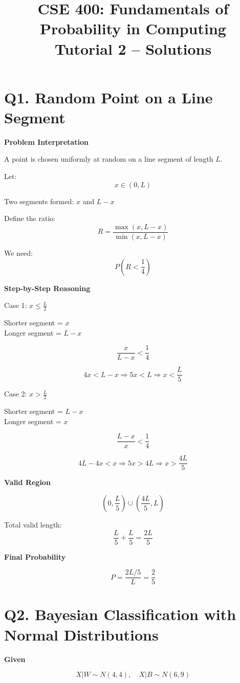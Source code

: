 \documentclass[11pt]{article}
\title{CSE 400: Fundamentals of Probability in Computing\\
Tutorial 2 -- Solutions}
\date{}
\begin{document}
\maketitle

\section*{Q1. Random Point on a Line Segment}

\textbf{Problem Interpretation}

A point is chosen uniformly at random on a line segment of length $L$.

Let:
\[
x \in (0, L)
\]

Two segments formed: $x$ and $L - x$

Define the ratio:
\[
R = \frac{\max(x, L - x)}{\min(x, L - x)}
\]

We need:
\[
P\left(R < \frac{1}{4}\right)
\]

\textbf{Step-by-Step Reasoning}

Case 1: $x \le \frac{L}{2}$

Shorter segment = $x$ \\
Longer segment = $L - x$

\[
\frac{x}{L - x} < \frac{1}{4}
\]

\[
4x < L - x
\Rightarrow 5x < L
\Rightarrow x < \frac{L}{5}
\]

Case 2: $x > \frac{L}{2}$

Shorter segment = $L - x$ \\
Longer segment = $x$

\[
\frac{L - x}{x} < \frac{1}{4}
\]

\[
4L - 4x < x
\Rightarrow 5x > 4L
\Rightarrow x > \frac{4L}{5}
\]

\textbf{Valid Region}

\[
(0, \frac{L}{5}) \cup (\frac{4L}{5}, L)
\]

Total valid length:
\[
\frac{L}{5} + \frac{L}{5} = \frac{2L}{5}
\]

\textbf{Final Probability}

\[
P = \frac{2L/5}{L} = \frac{2}{5}
\]

\section*{Q2. Bayesian Classification with Normal Distributions}

\textbf{Given}

\[
X|W \sim N(4,4), \quad X|B \sim N(6,9)
\]
\end{document}
